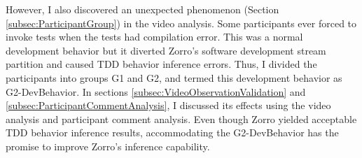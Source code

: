 However, I also discovered an unexpected phenomenon (Section 
\ref{subsec:ParticipantGroup}) in the video analysis. Some 
participants ever forced to invoke tests when the tests
had compilation error. This was a normal development behavior
but it diverted Zorro's software development stream partition
and caused TDD behavior inference errors. Thus, I divided
the participants into groups G1 and G2, and termed this 
development behavior as G2-DevBehavior. In sections
\ref{subsec:VideoObservationValidation} and  
\ref{subsec:ParticipantCommentAnalysis}, I discussed
its effects using the video analysis and participant comment
analysis. Even though Zorro yielded acceptable TDD 
behavior inference results, accommodating the G2-DevBehavior 
has the promise to improve Zorro's inference capability.